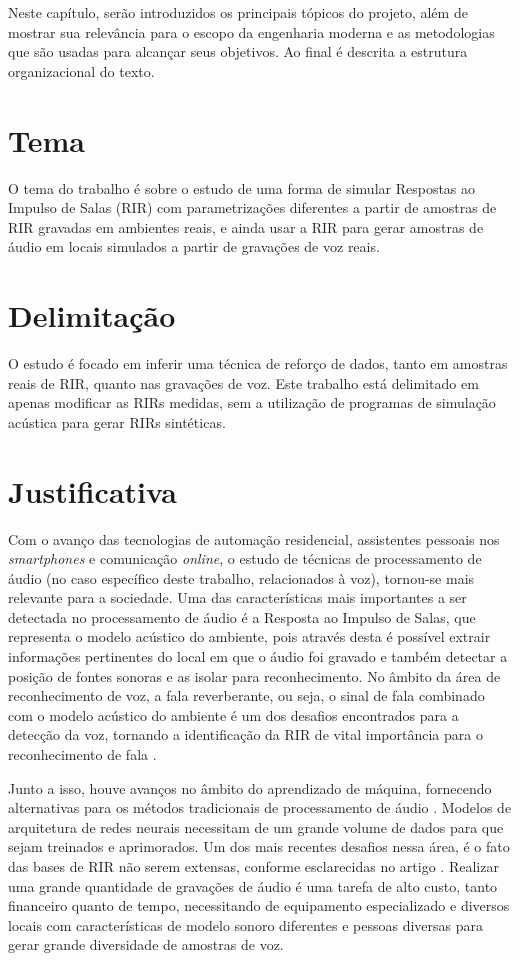 Neste capítulo, serão introduzidos os principais tópicos do projeto, além de mostrar sua relevância para o escopo da engenharia moderna
e as metodologias que são usadas para alcançar seus objetivos. Ao final é descrita a estrutura organizacional do texto.

\section{Tema}

O tema do trabalho é sobre o estudo de uma forma de simular Respostas ao Impulso de Salas (RIR) com parametrizações diferentes a partir de amostras 
de RIR gravadas em ambientes reais, e ainda usar a RIR para gerar amostras de áudio em locais simulados a partir de gravações de voz reais.

\section{Delimitação}

O estudo é focado em inferir uma técnica de reforço de dados, tanto em amostras reais de RIR, quanto nas gravações de voz. 
Este trabalho está delimitado em apenas modificar as RIRs medidas, sem a utilização de programas de simulação acústica para gerar
RIRs sintéticas. 

\section{Justificativa}

Com o avanço das tecnologias de automação residencial, assistentes pessoais nos \textit{smartphones} e comunicação \textit{online}, o estudo de técnicas de
processamento de áudio (no caso específico deste trabalho, relacionados à voz), tornou-se mais relevante para a sociedade.
Uma das características mais importantes a ser detectada no processamento de áudio é a Resposta ao Impulso de Salas, 
que representa o modelo acústico do ambiente, pois através desta é possível extrair informações pertinentes do local em que o áudio foi gravado
e também detectar a posição de fontes sonoras e as isolar para reconhecimento.
No âmbito da área de reconhecimento de voz, a fala reverberante, ou seja, o sinal de fala combinado com o modelo acústico do ambiente
é um dos desafios encontrados para a detecção da voz, tornando a identificação da RIR de vital importância para o reconhecimento de fala \cite{FAR-FIELD_ASR}.

Junto a isso, houve avanços no âmbito do aprendizado de máquina, fornecendo alternativas para os métodos tradicionais
de processamento de áudio \cite{ML_Speech_Rec}.
Modelos de arquitetura de redes neurais necessitam de um grande volume de dados para que sejam treinados e aprimorados. Um dos mais recentes
desafios nessa área, é o fato das bases de RIR não serem extensas, conforme esclarecidas no artigo \cite{Estimation_RT_DRR}.
Realizar uma grande quantidade de gravações de áudio é uma tarefa de alto custo, tanto financeiro quanto de tempo, necessitando de equipamento especializado
e diversos locais com características de modelo sonoro diferentes e pessoas diversas para gerar grande diversidade de amostras de voz.



